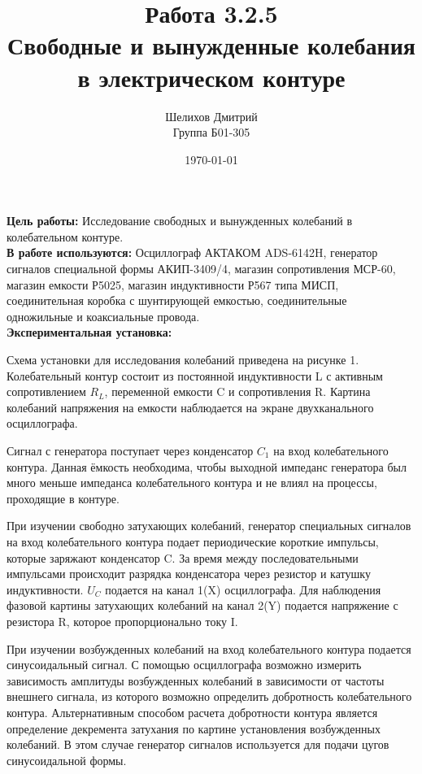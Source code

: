 \documentclass[a4paper,12pt]{article}
\author{Шелихов Дмитрий\\Группа Б01-305}
\title{\textbf{Работа 3.2.5\\Свободные и вынужденные колебания в электрическом контуре}}
\date{\today}
\begin{document}
 
\maketitle

\textbf{Цель работы:} Исследование свободных и вынужденных колебаний в колебательном контуре. \\

\textbf{В работе используются: } Осциллограф АКТАКОМ ADS-6142H, генератор сигналов специальной формы АКИП-3409/4, магазин сопротивления МСР-60, магазин емкости Р5025, магазин индуктивности Р567 типа МИСП, соединительная коробка с шунтирующей емкостью, соединительные одножильные и коаксиальные провода. \\

\textbf{Экспериментальная установка: }

\par Схема установки для исследования колебаний приведена на рисунке 1.
Колебательный контур состоит из постоянной индуктивности L с активным сопротивлением $R_L$, переменной емкости C и сопротивления R. Картина колебаний
напряжения на емкости наблюдается на экране двухканального осциллографа.

\par Сигнал с генератора поступает через конденсатор $C_1$ на вход колебательного контура. Данная ёмкость необходима, чтобы выходной импеданс генератора был много меньше импеданса колебательного контура и не влиял на процессы, проходящие в контуре. 

\par При изучении свободно затухающих колебаний, генератор специальных сигналов на вход колебательного контура подает периодические короткие импульсы, которые заряжают конденсатор C. За время между последовательными импульсами происходит разрядка конденсатора через резистор и катушку индуктивности. $U_C$ подается на канал 1(X) осциллографа. Для наблюдения фазовой картины затухающих колебаний на канал 2(Y) подается напряжение с резистора R, которое пропорционально току I.

\par При изучении возбужденных колебаний на вход колебательного контура подается синусоидальный сигнал. С помощью осциллографа возможно измерить зависимость амплитуды возбужденных колебаний в зависимости от частоты внешнего сигнала, из которого возможно определить добротность колебательного контура. Альтернативным способом расчета добротности контура является определение декремента затухания по картине установления возбужденных колебаний. В этом случае генератор сигналов используется для подачи цугов синусоидальной формы.
\end{document}
